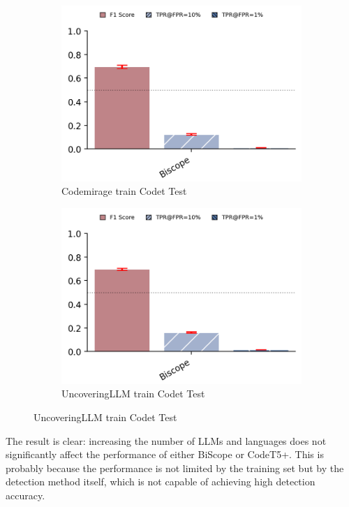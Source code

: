 \begin{figure}[H]
    \begin{subfigure}[b]{0.45\textwidth}
        \centering
        \includegraphics[width=\linewidth]{img/condemiragetrainbiscope.png}
        \caption{Codemirage train Codet Test}
        \label{fig:ffesfe6}
    \end{subfigure}
    \hfill
    \begin{subfigure}[b]{0.4\textwidth}
        \centering
        \includegraphics[width=\linewidth]{img/uncoveringiscope.png}
        \caption{UncoveringLLM train Codet Test}
        \label{fig:bfseds6}
    \end{subfigure}
\end{figure}


The result is clear: increasing the number of LLMs and languages 
does not significantly affect the performance of either BiScope 
or CodeT5+. This is probably because the performance is not 
limited by the training set but by the detection method itself, 
which is not capable of achieving high detection accuracy.

